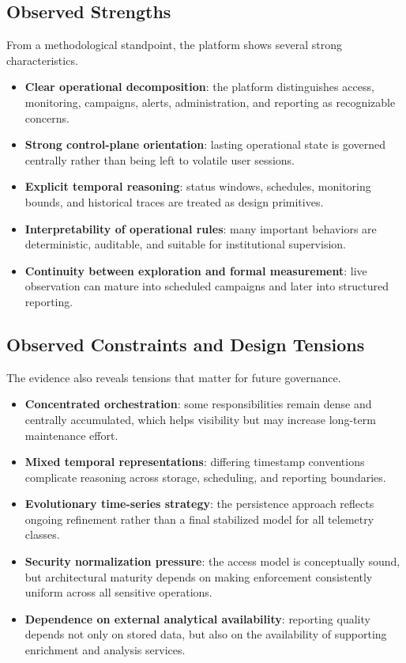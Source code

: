 \documentclass[11pt,a4paper]{article}
\begin{document}
\subsection{Observed Strengths}
From a methodological standpoint, the platform shows several strong characteristics.

\begin{itemize}
  \item \textbf{Clear operational decomposition}: the platform distinguishes access, monitoring, campaigns, alerts, administration, and reporting as recognizable concerns.
  \item \textbf{Strong control-plane orientation}: lasting operational state is governed centrally rather than being left to volatile user sessions.
  \item \textbf{Explicit temporal reasoning}: status windows, schedules, monitoring bounds, and historical traces are treated as design primitives.
  \item \textbf{Interpretability of operational rules}: many important behaviors are deterministic, auditable, and suitable for institutional supervision.
  \item \textbf{Continuity between exploration and formal measurement}: live observation can mature into scheduled campaigns and later into structured reporting.
\end{itemize}

\subsection{Observed Constraints and Design Tensions}
The evidence also reveals tensions that matter for future governance.

\begin{itemize}
  \item \textbf{Concentrated orchestration}: some responsibilities remain dense and centrally accumulated, which helps visibility but may increase long-term maintenance effort.
  \item \textbf{Mixed temporal representations}: differing timestamp conventions complicate reasoning across storage, scheduling, and reporting boundaries.
  \item \textbf{Evolutionary time-series strategy}: the persistence approach reflects ongoing refinement rather than a final stabilized model for all telemetry classes.
  \item \textbf{Security normalization pressure}: the access model is conceptually sound, but architectural maturity depends on making enforcement consistently uniform across all sensitive operations.
  \item \textbf{Dependence on external analytical availability}: reporting quality depends not only on stored data, but also on the availability of supporting enrichment and analysis services.
\end{itemize}
\end{document}
